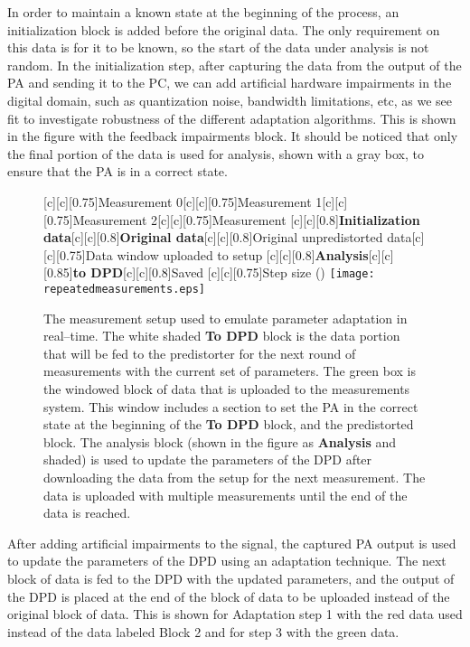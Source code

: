 \documentclass[journal]{IEEEtran}
\begin{document}
In order to maintain a known state at the beginning of the process, an initialization block is added before the original data. The only requirement on this data is for it to be known, so the start of the data under analysis is not random. In the initialization step, after capturing the data from the output of the PA and sending it to the PC, we can add artificial hardware impairments in the digital domain, such as quantization noise, bandwidth limitations, etc, as we see fit to investigate robustness of the different adaptation algorithms. This is shown in the figure with the feedback impairments block. It should be noticed that only the final portion of the data is used for analysis, shown with a gray box, to ensure that the PA is in a correct state.

\begin{figure*}
\centering
{}[c][c][0.75]{Measurement 0}[c][c][0.75]{Measurement 1}[c][c][0.75]{Measurement 2}[c][c][0.75]{Measurement }[c][c][0.8]{\textbf{Initialization data}}[c][c][0.8]{\textbf{Original data}}[c][c][0.8]{Original unpredistorted data}[c][c][0.75]{Data window uploaded to setup} [c][c][0.8]{\textbf{Analysis}}[c][c][0.85]{\textbf{to DPD}}[c][c][0.8]{Saved}
[c][c][0.75]{Step size ()}
\texttt{[image: repeatedmeasurements.eps]}
\caption{The measurement setup used to emulate parameter adaptation in real--time. The white shaded \textbf{To DPD} block is the data portion that will be fed to the predistorter for the next round of measurements with the current set of parameters. The green box is the windowed block of data that is uploaded to the measurements system. This window includes a section to set the PA in the correct state at the beginning of the \textbf{To DPD} block, and the predistorted block. The analysis block (shown in the figure as \textbf{Analysis} and shaded) is used to update the parameters of the DPD after downloading the data from the setup for the next measurement. The data is uploaded with multiple measurements until the end of the data is reached.}
\label{repeatedmeasurements}
\end{figure*}


After adding artificial impairments to the signal, the captured PA output is used to update the parameters of the DPD using an adaptation technique. The next block of data is fed to the DPD with the updated parameters, and the output of the DPD is placed at the end of the block of data to be uploaded instead of the original block of data. This is shown for Adaptation step 1 with the red data used instead of the data labeled Block 2 and for step 3 with the green data.
\end{document}
